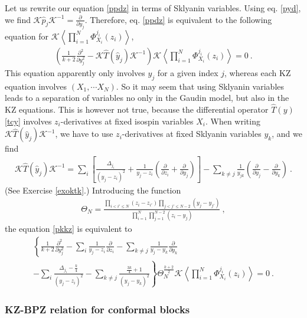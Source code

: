 \documentclass[12pt, a4paper, notitlepage, twoside]{report}
\numberwithin{equation}{section}
\theoremstyle{break}
\begin{document}
Let us rewrite our equation \eqref{ppdz} in terms of Sklyanin variables.
Using eq. \eqref{pyd}, we find
$\mathcal{K} \hat{p}_j \mathcal{K}^{-1}= {\frac{\partial}{\partial y_j}} $.
Therefore,  
eq. \eqref{ppdz} is equivalent to the following equation for $\mathcal{K}\left\langle \prod_{i=1}^N \Phi^{j_i}_{X_i}(z_i)\right\rangle$,
\begin{align}
 \left(\frac{1}{k+2}\frac{\partial ^2}{\partial y_j^2} - \mathcal{K} \hat{T}(\hat{y}_j) \mathcal{K}^{-1}\right)\mathcal{K}\left\langle \prod_{i=1}^N \Phi^{j_i}_{X_i}(z_i)\right\rangle  = 0\ .
\label{pkkz}
\end{align}
This equation apparently only involves $y_j$ for a given index $j$, whereas each KZ equation involves $(X_1,\cdots X_N)$. 
So it may seem that using Sklyanin variables leads to a separation of variables no only in the Gaudin model, but also
in the KZ equations. 
This is however not true, because the differential operator $\hat{T}(y)$ \eqref{tcy} involves $z_i$-derivatives at fixed isospin variables $X_i$.
When writing $\mathcal{K} \hat{T}(\hat{y}_j) \mathcal{K}^{-1}$, we have to use $z_i$-derivatives at fixed Sklyanin variables $y_k$, and we find
\begin{align}
\mathcal{K} \hat{T}(\hat{y}_j) \mathcal{K}^{-1} = \sum_i\left[\frac{\Delta_{j_i}}{(y_j-z_i)^2}+ \frac{1}{y_j-z_i}\left({\frac{\partial}{\partial z_i}}+{\frac{\partial}{\partial y_j}}\right)\right]-\sum_{k\neq j}\frac{1}{y_{jk}}\left({\frac{\partial}{\partial y_j}}-{\frac{\partial}{\partial y_k}}\right)\ .
\label{dtyj}
\end{align}
(See Exercise \ref{exoktk}.) 
Introducing the function
\begin{align}
 \Theta_N = \frac{\prod_{i<i'\leq N}(z_i-z_{i'})\prod_{j<j'\leq N-2}(y_j-y_{j'})}{\prod_{i=1}^N\prod_{j=1}^{N-2}(z_i-y_j)}\ ,
\end{align}
the equation \eqref{pkkz} is equivalent to 
\begin{multline}
 \left\{\frac{1}{k+2}  \frac{\partial^2}{\partial y_j^2} - \sum_i\frac{1}{y_j-z_i}{\frac{\partial}{\partial z_i}} -\sum_{k\neq j}\frac{1}{y_j-y_k} {\frac{\partial}{\partial y_k}}
\right. \\ \left.
 -\sum_i\frac{\Delta_{j_i}-\frac{k}{4}}{(y_j-z_i)^2}  -\sum_{k\neq j}\frac{\frac{3k}{4}+1}{(y_j-y_k)^2}   \right\} \Theta_N^{\frac{k+2}{2}}\mathcal{K}\left\langle \prod_{i=1}^N \Phi^{j_i}_{X_i}(z_i)\right\rangle = 0\ .
 \label{vskz}
\end{multline}

\subsubsection{KZ-BPZ relation for conformal blocks}
\end{document}
